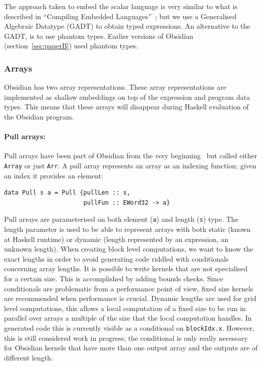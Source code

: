 \documentclass[a4paper]{book}
\begin{document}
The approach taken to embed the scalar language is very similar to what is described 
in ``Compiling Embedded Languages''~\citet{COMPILEEDSL}; but we use a Generalised Algebraic 
Datatype (GADT) to obtain typed expressions. An alternative to the GADT, is to use phantom 
types. Earlier versions of Obsidian (section~\ref{sec:paperB}) used phantom types. 


\subsubsection{Arrays} 
\label{sec:OBSARRAYS}

Obsidian has two array representations. These array representations are implemented as 
shallow embeddings on top of the expression and program data types. This means that these 
arrays will disappear during Haskell evaluation of the Obsidian program.
 
\paragraph{Pull arrays:}

Pull arrays have been part of Obsidian from the very beginning~\citet{JMT} but called either 
{\tt Array} or just {\tt Arr}. A pull array represents an array as an indexing function; given 
an index it provides an element: 

\begin{verbatim} 
data Pull s a = Pull {pullLen :: s, 
                      pullFun :: EWord32 -> a}
\end{verbatim} 

Pull arrays are parameterised on both element ({\tt a}) and length ({\tt s}) type. The length 
parameter is used to be able to represent arrays with both static (known at Haskell runtime) 
or dynamic (length represented by an expression, an unknown length). When creating block 
level computations, we want to know the exact lengths in order to avoid generating code 
riddled with conditionals concerning array lengths. It is possible to write kernels that 
are not specialised for a certain size. This is accomplished by adding bounds checks. Since 
conditionals  are problematic from a performance point of view, fixed size kernels are recommended 
when performance is crucial. Dynamic lengths are used for grid level computations, this allows 
a local computation of a fixed size to be run in parallel over arrays a multiple of the size that 
the local computation handles. In generated code this is currently visible as a conditional 
on {\tt blockIdx.x}. However, this is still considered work in progress; the conditional is 
only really necessary for Obsidian kernels that have more than one output array and the outputs
are of different length. 
\end{document}
